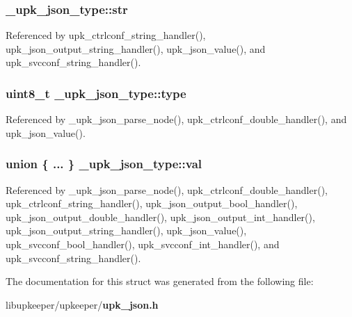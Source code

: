 \subsubsection[{str}]{ {\bf \_\-upk\_\-json\_\-type::str}}\label{struct__upk__json__type_a1defbbfede6d554468f8882ecb0596bb}


Referenced by upk\_\-ctrlconf\_\-string\_\-handler(), upk\_\-json\_\-output\_\-string\_\-handler(), upk\_\-json\_\-value(), and upk\_\-svcconf\_\-string\_\-handler().

\subsubsection[{type}]{\setlength{\rightskip}{0pt plus 5cm}uint8\_\-t {\bf \_\-upk\_\-json\_\-type::type}}\label{struct__upk__json__type_a05591e8d4aab13a955e11c7f8b70d291}


Referenced by \_\-upk\_\-json\_\-parse\_\-node(), upk\_\-ctrlconf\_\-double\_\-handler(), and upk\_\-json\_\-value().

\subsubsection[{val}]{\setlength{\rightskip}{0pt plus 5cm}union \{ ... \}   {\bf \_\-upk\_\-json\_\-type::val}}\label{struct__upk__json__type_ad5efc0c2526553500e6bc65af469e084}


Referenced by \_\-upk\_\-json\_\-parse\_\-node(), upk\_\-ctrlconf\_\-double\_\-handler(), upk\_\-ctrlconf\_\-string\_\-handler(), upk\_\-json\_\-output\_\-bool\_\-handler(), upk\_\-json\_\-output\_\-double\_\-handler(), upk\_\-json\_\-output\_\-int\_\-handler(), upk\_\-json\_\-output\_\-string\_\-handler(), upk\_\-json\_\-value(), upk\_\-svcconf\_\-bool\_\-handler(), upk\_\-svcconf\_\-int\_\-handler(), and upk\_\-svcconf\_\-string\_\-handler().



The documentation for this struct was generated from the following file:\begin{DoxyCompactItemize}
\item 
libupkeeper/upkeeper/{\bf upk\_\-json.h}\end{DoxyCompactItemize}
